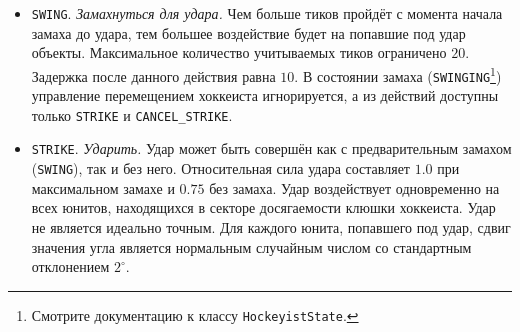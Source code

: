 \begin{itemize}
\begin{itemize}
{          $-\pi/12.0$ до $\pi/12.0$ радиан.}В противном случае действие игнорируется и не инициирует задержку. То же происходит и в случае,
          если хоккеист уже контролирует шайбу. Если шайба контролируется другим хоккеистом, то она будет перехвачена с вероятностью
          $25\%$\footnote[4]{Для любого вероятностного события в игре действуют следующие ограничения: если шанс свершения события меньше
          $5\%$, то он считается равным $5\%$; если шанс больше $95\%$, то он считается равным $95\%$.}Хоккеист, потерявший шайбу, не может
          совершать действия в течение $10$ тиков. Если шайба не контролируется другим хоккеистом и находится в состоянии покоя, то базовый
          шанс установить над ней контроль равен $150\%$. Это значение равномерно уменьшается с ростом скорости шайбы, достигая (но не
          останавливаясь на) $50\%$ при $20.0$ тиках$^{-1}$ --- скорости, придаваемой шайбе после удара по ней хоккеиста, находящегося в
          состоянии покоя. В случае успеха действия хоккеист становится владельцем шайбы. Это означает, что игровой симулятор в конце
          каждого тика устанавливает положение центра шайбы в точку перед хоккеистом на расстоянии $55.0$ от его центра.
    \item \texttt{SWING}. \textit{Замахнуться для удара.} Чем больше тиков пройдёт с момента начала замаха до удара, тем большее воздействие
          будет на попавшие под удар объекты. Максимальное количество учитываемых тиков ограничено $20$. Задержка после данного действия
          равна $10$. В состоянии замаха (\texttt{SWINGING}\footnote[5]{Смотрите документацию к классу \texttt{HockeyistState}.}) управление
          перемещением хоккеиста игнорируется, а из действий доступны только \texttt{STRIKE} и \texttt{CANCEL\_STRIKE}.
    \item \texttt{STRIKE}. \textit{Ударить.} Удар может быть совершён как с предварительным замахом (\texttt{SWING}), так и без него.
          Относительная сила удара составляет $1.0$ при максимальном замахе и $0.75$ без замаха. Удар воздействует одновременно на всех
          юнитов, находящихся в секторе досягаемости клюшки хоккеиста. Удар не является идеально точным. Для каждого юнита, попавшего под
          удар, сдвиг значения угла является нормальным случайным числом со стандартным отклонением $2^\circ$.


\end{itemize}
\end{itemize}
